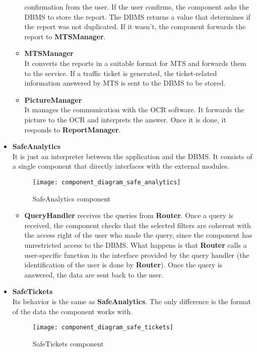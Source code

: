 \documentclass[./main.tex]{subfiles}
\begin{document}
\begin{itemize}
\begin{itemize}
    confirmation from the user. If the user confirms, the component asks the
    DBMS to store the report. The DBMS returns a value that determines if the
    report was not duplicated. If it wasn't, the component forwards the report
    to \textbf{MTSManager}.
  \item
    \textbf{MTSManager}\\
    It converts the reports in a suitable format for MTS and forwards them to
    the service. If a traffic ticket is generated, the ticket-related
    information answered by MTS is sent to the DBMS to be stored.
  \item
    \textbf{PictureManager}\\
    It manages the communication with the OCR software. It forwards the picture
    to the OCR and interprets the answer. Once it is done, it responds to
    \textbf{ReportManager}.
  \end{itemize}
\item
  \textbf{SafeAnalytics}\\
  It is just an interpreter between the application and the DBMS. It consists
  of a single component that directly interfaces with the external modules.
  \begin{figure}[H]
  \centering
  \texttt{[image: component\_diagram\_safe\_analytics]}
  \caption{SafeAnalytics component}
  \end{figure}
  \begin{itemize}
  \item
    \textbf{QueryHandler} receives the queries from \textbf{Router}. Once a
    query is received, the component checks that the selected filters are
    coherent with the access right of the user who made the query, since the
    component has unrestricted access to the DBMS. What happens is that
    \textbf{Router} calls a user-specific function in the interface provided by
    the query handler (the identification of the user is done by
    \textbf{Router}). Once the query is answered, the data are sent back to the
    user.
  \end{itemize}
\item
  \textbf{SafeTickets}\\
  Its behavior is the same as \textbf{SafeAnalytics}. The only difference is
  the format of the data the component works with.
  \begin{figure}[H]
  \centering
  \texttt{[image: component\_diagram\_safe\_tickets]}
  \caption{SafeTickets component}
  \end{figure}

\end{itemize}
\end{document}
